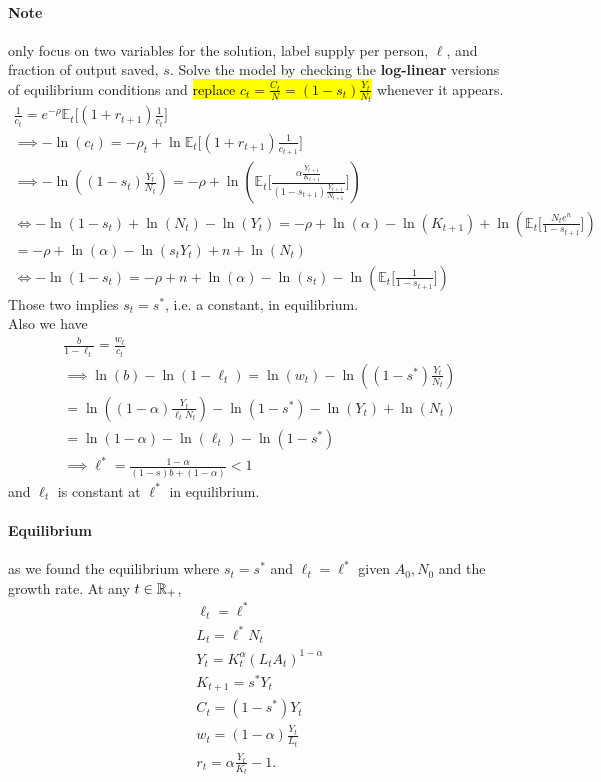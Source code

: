 \documentclass[11pt]{article}
\newcommand{\expat}[2]{\mathbb{E}_{#1}\Big[{#2}\Big]}
\begin{document}
		\paragraph{Note} only focus on two variables for the solution, label supply per person, $\ell$, and fraction of output saved, $s$. Solve the model by checking the \textbf{log-linear} versions of equilibrium conditions and \hl{replace $c_t = \frac{C_t}{N} = (1-s_t)\frac{Y_t}{N_t}$} whenever it appears.
		\begin{gather}
			\frac{1}{c_t} = e^{-\rho} \expat{t}{(1+r_{t+1})\frac{1}{c_t}} \\
			\implies -\ln(c_t) = - \rho_t + \ln \expat{t}{(1+r_{t+1})\frac{1}{c_{t+1}}} \\
			\implies - \ln((1-s_t)\frac{Y_t}{N_t}) = -\rho + \ln(\expat{t}{\frac{\alpha \frac{Y_{t+1}}{K_{t+1}}}{(1-s_{t+1})\frac{Y_{t+1}}{N_{t+1}}}}) \\
			\iff -\ln(1-s_t) + \ln(N_t) - \ln(Y_t) = -\rho + \ln(\alpha) - \ln(K_{t+1}) + \ln(\expat{t}{\frac{N_t e^n}{1-s_{t+1}}}) \\
			= -\rho + \ln(\alpha) - \ln(s_t Y_t) + n + \ln(N_t) \\
			\iff -\ln(1-s_t) = -\rho + n + \ln(\alpha) - \ln(s_t) - \ln(\expat{t}{\frac{1}{1-s_{t+1}}})
		\end{gather}
		Those two implies $s_t = s^*$, i.e. a constant, in equilibrium. \\
		Also we have 
		\begin{gather}
			\frac{b}{1-\ell_t} = \frac{w_t}{c_t} \\
			\implies \ln(b) - \ln(1-\ell_t) = \ln(w_t) - \ln((1-s^*)\frac{Y_t}{N_t}) \\
			= \ln((1-\alpha) \frac{Y_t}{\ell_t N_t}) - \ln(1-s^*) - \ln(Y_t) + \ln(N_t) \\
			= \ln(1-\alpha) - \ln(\ell_t) - \ln(1-s^*)\\
			\implies \ell^* = \frac{1-\alpha}{(1-s)b + (1-\alpha)} < 1
		\end{gather}
		and $\ell_t$ is constant at $\ell^*$ in equilibrium.
		\paragraph{Equilibrium} as we found the equilibrium where $s_t = s^*$ and $\ell_t = \ell^*$ given $A_0, N_0$ and the growth rate. At any $t \in \mathbb{R}_+$,
		\begin{gather}
			\ell_t = \ell^* \\
			L_t = \ell^* N_t \\
			Y_t = K_t^\alpha (L_t A_t) ^{1-\alpha} \\
			K_{t+1} = s^* Y_t \\
			C_t = (1-s^*)Y_t \\
			w_t = (1-\alpha) \frac{Y_t}{L_t} \\
			r_t = \alpha \frac{Y_t}{K_t} - 1.
		\end{gather}
		
\end{document}

